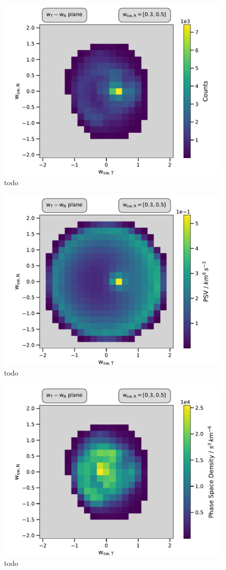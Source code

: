 \begin{figure}[h]
	\includegraphics[width=.8\textwidth]{Figures/cart_50_counts_R.pdf}
	\centering
	\caption{todo}
	\label{fig:counts_50}
\end{figure}

\begin{figure}[h]
	\includegraphics[width=.8\textwidth]{Figures/cart_50_norm_R.pdf}
	\centering
	\caption{todo}
	\label{fig:norm_50}
\end{figure}

\begin{figure}[h]
	\includegraphics[width=.8\textwidth]{Figures/cart_50_ps_R.pdf}
	\centering
	\caption{todo}
	\label{fig:psd_50}
\end{figure}

